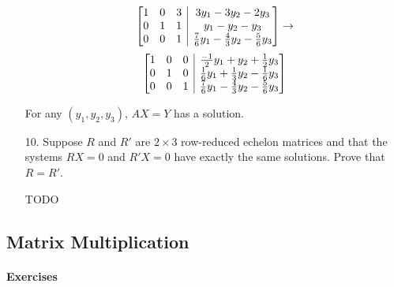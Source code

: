 \documentclass{article}
\makeatletter
\newenvironment{abmatrix}[2]
{
    \left[
        \begin{array} {@{} *{#1}{c} | *{#2}c @{}}
}
{
        \end{array}
    \right]
}
\makeatother
\begin{document}
\begin{enumerate}[listparindent=\parindent]
\[\begin{abmatrix}{3}{1}
        1 & 0 & 3 & 3y_1 - 3y_2 - 2y_3 \\
        0 & 1 & 1 & y_1 - y_2 - y_3 \\
        0 & 0 & 1 & \frac{7}{6}y_1 - \frac{4}{3}y_2 - \frac{5}{6}y_3
    \end{abmatrix}
    \rightarrow
\]
\[
    \begin{abmatrix}{3}{1}
        1 & 0 & 0 & \frac{-1}{2}y_1 + y_2 + \frac{1}{2}y_3 \\
        0 & 1 & 0 & \frac{1}{6}y_1 + \frac{1}{3}y_2 - \frac{1}{6}y_3 \\
        0 & 0 & 1 & \frac{7}{6}y_1 - \frac{4}{3}y_2 - \frac{5}{6}y_3
    \end{abmatrix}
\]

For any \((y_1, y_2, y_3)\), \(AX = Y\) has a solution.

\item[10.] Suppose \(R\) and \(R'\) are \(2 \times 3\) row-reduced echelon matrices and that the
    systems \(RX = 0\) and \(R'X = 0\) have exactly the same solutions. Prove that \(R = R'\).

    TODO
\end{enumerate}

\subsection{Matrix Multiplication}
\paragraph{Exercises}
\end{document}
